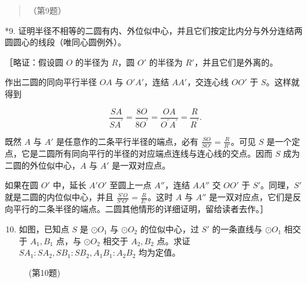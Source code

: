 \begin{quote}
（第9题）
\end{quote}

*9.
证明半径不相等的二圆有内、外位似中心，并且它们按定比内分与外分连结两圆圆心的线段（唯同心圆例外）。

［略证：假设圆 \(O\) 的半径为 \(R\)，圆 \(O'\) 的半径为
\(R'\)，并且它们是外离的。

作出二圆的同向平行半径 \(OA\) 与 \(O'A'\)，连结 \(AA'\)，交连心线
\(OO'\) 于 \(S\)。这样就得到

\[
\frac {S A}{S A ^ {\prime}} = \frac {8 O}{8 O ^ {\prime}} = \frac {O A}{O ^ {\prime} A ^ {\prime}} = \frac {R}{R ^ {\prime}}.
\]

既然 \(A\) 与 \(A'\) 是任意作的二条平行半径的端点，必有
\(\frac{SO}{SO'} = \frac{R}{R'}\)。可见 \(S\)
是一个定点，它是二圆所有同向平行的半径的对应端点连线与连心线的交点。因而
\(S\) 成为二圆的外位似中心，\(A\) 与 \(A'\) 是一双对应点。

如果在圆 \(O'\) 中，延长 \(A'O'\) 至圆上一点 \(A''\)，连结 \(AA''\) 交
\(OO'\) 于 \(S'\)。同理，\(S'\) 就是二圆的内位似中心，并且
\(\frac{S'O}{S'O'} = \frac{R}{E'}\)。这时 \(A\) 与 \(A''\)
是一双对应点，它们是反向平行的二条半径的端点。二圆其他情形的详细证明，留给读者去作。］

\begin{enumerate}
\setcounter{enumi}{9}
\item
  如图，已知点 \(S\) 是 \(\odot O_1\) 与 \(\odot O_2\) 的位似中心，过
  \(S'\) 的一条直线与 \(\odot O_1\) 相交于 \(A_1, B_1\) 点，与
  \(\odot O_2\) 相交于 \(A_2, B_2\) 点。求证
  \(SA_1: SA_2, SB_1: SB_2, A_1B_1: A_2B_2\) 均为定值。
\end{enumerate}

\begin{figure}
\centering
{}
\caption{(第10题)}
\end{figure}

